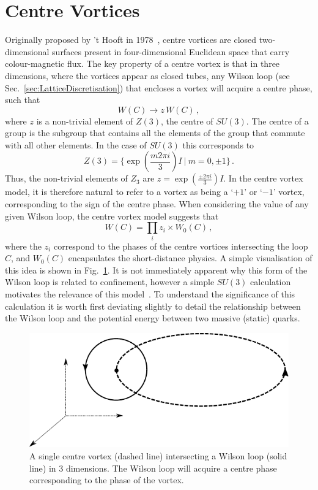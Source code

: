 \section{Centre Vortices}
Originally proposed by 't Hooft in 1978~\cite{'tHooft:1977hy,'tHooft:1979uj}, centre vortices are closed two-dimensional surfaces present in four-dimensional Euclidean space that carry colour-magnetic flux. The key property of a centre vortex is that in three dimensions, where the vortices appear as closed tubes, any Wilson loop (see Sec.~\ref{sec:LatticeDiscretisation}) that encloses a vortex will acquire a centre phase, such that
%
\begin{equation}
W(C)\rightarrow z \,W(C)\, ,
\end{equation}
%
where $z$ is a non-trivial element of $Z(3)$, the centre of $SU(3)$. The centre of a group is the subgroup that contains all the elements of the group that commute with all other elements. In the case of $SU(3)$ this corresponds to
%
\begin{equation}
Z(3) = \big\lbrace \exp\left(\frac{m 2\pi i}{3} \right)I ~ | ~ m = 0,\pm 1\big\rbrace\, . 
\end{equation}
%
Thus, the non-trivial elements of $Z_3$ are $z = \exp\left(\frac{\pm 2\pi i}{3}\right)I$. In the centre vortex model, it is therefore natural to refer to a vortex as being a `$+1$' or `$-1$' vortex, corresponding to the sign of the centre phase. When considering the value of any given Wilson loop, the centre vortex model suggests that
%
\begin{equation}
W(C) = \prod_i z_i\times W_0(C)\, ,
\end{equation}
%
where the $z_i$ correspond to the phases of the centre vortices intersecting the loop $C$, and $W_0(C)$ encapsulates the short-distance physics. A simple visualisation of this idea is shown in Fig.~\ref{fig:CentreVortex}. It is not immediately apparent why this form of the Wilson loop is related to confinement, however a simple $SU(3)$ calculation motivates the relevance of this model~\cite{Greensite:2016pfc}. To understand the significance of this calculation it is worth first deviating slightly to detail the relationship between the Wilson loop and the potential energy between two massive (static) quarks.\\
% 
\begin{figure}
\centering
\includegraphics[width=\linewidth]{./centre_vortex.pdf}
\caption{\label{fig:CentreVortex} A single centre vortex (dashed line) intersecting a Wilson loop (solid line) in 3 dimensions. The Wilson loop will acquire a centre phase corresponding to the phase of the vortex.}
\end{figure}
%

